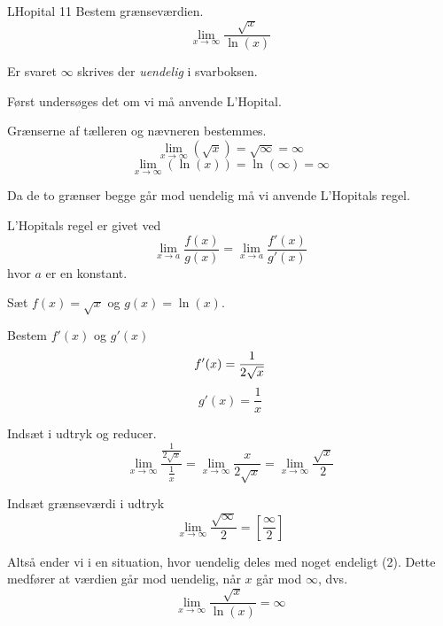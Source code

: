 \documentclass{article}
\begin{document}
\begin{exercise}{LHopital 11}
Bestem grænseværdien.
\[
\lim_{x \to \infty} \frac{\sqrt{x}}{\ln(x)}
\] 

Er svaret $\infty$ skrives der \emph{uendelig} i svarboksen.


\hint
Først undersøges det om vi må anvende L'Hopital.

\hint
Grænserne af tælleren og nævneren bestemmes.
\[
\lim_{x \to \infty} (\sqrt{x}) = \sqrt{\infty} = \infty
\]
\[
\lim_{x \to \infty} (\ln(x)) = \ln(\infty) = \infty
\]

\hint
Da de to grænser begge går mod uendelig må vi  anvende L'Hopitals regel. 

\hint
L'Hopitals regel er givet ved
\[
\lim_{x \to a} \frac{f(x)}{g(x)} = \lim_{x \to a} \frac{f'(x)}{g'(x)} 
\]
hvor $a$  er en konstant.

\hint
Sæt $f(x) = \sqrt{x}$ og $g(x) = \ln(x)$. 

\hint
Bestem $f'(x)$ og $g'(x)$
\[
f'(x) = \frac{1}{2\sqrt{x}} \\
\]
\[
g'(x) = \frac{1}{x}
\]

\hint
Indsæt i udtryk og reducer. 
\[
\lim_{x \to \infty} \frac{ \frac{1}{2 \sqrt{x}} }{ \frac{1}{x} } = \lim_{x \to \infty} \frac{x}{2 \sqrt{x}} = 	\lim_{x \to \infty} \frac{\sqrt{x}}{2}
\]

\hint
Indsæt grænseværdi i udtryk
\[
\lim_{x \to \infty} \frac{\sqrt{\infty}}{2}  = \left[ \frac{\infty}{2}  \right] 
\]

\hint
Altså ender vi i en situation, hvor uendelig deles med noget endeligt (2). Dette medfører at værdien går mod uendelig, når $x$ går mod $\infty$, dvs.
\[
\lim_{x \to \infty} \frac{\sqrt{x}}{\ln(x)} = \infty
\]

\end{exercise}
\end{document}
